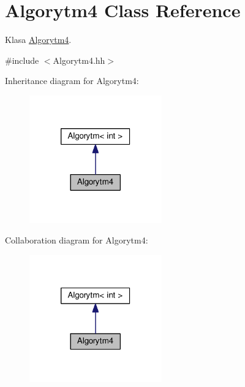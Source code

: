 \hypertarget{a00005}{}\section{Algorytm4 Class Reference}
\label{a00005}


Klasa \hyperlink{a00005}{Algorytm4}.  




{\ttfamily \#include $<$Algorytm4.\+hh$>$}



Inheritance diagram for Algorytm4\+:
\nopagebreak
\begin{figure}[H]
\begin{center}
\leavevmode
\includegraphics[width=162pt]{a00113}
\end{center}
\end{figure}


Collaboration diagram for Algorytm4\+:
\nopagebreak
\begin{figure}[H]
\begin{center}
\leavevmode
\includegraphics[width=162pt]{a00114}
\end{center}
\end{figure}
